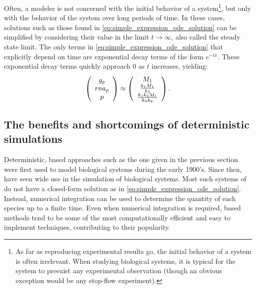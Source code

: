 Often, a modeler is not concerned with the initial behavior of a system\footnote{As far as reproducing experimental results go, the initial behavior of a system is often irrelevant. When studying biological systems, it is typical for the system to preexist any experimental observation (though an obvious exception would be any stop-flow experiment).}, but only with the behavior of the system over long periods of time. In these cases, solutions such as those found in \eqref{eq:simple_expression_ode_solution} can be simplified by considering their value in the limit $t \rightarrow \infty$, also called the steady state limit. The only terms in \eqref{eq:simple_expression_ode_solution} that explicitly depend on time are exponential decay terms of the form $e^{-t x}$. These exponential decay terms quickly approach $0$ as $t$ increases, yielding:
\begin{gather*}\label{eq:simple_expression_ode_solution_ss}
    \left( \begin{array}{c}
        \con{g_p} \\
        \con{rna_p} \\
        \con{p}
    \end{array} \right) \approx
%
    \left( \begin{array}{c}
        \markmat_1 \\
        \frac{\condetx{1} \markmat_1}{\condetx{3}} \\
        \frac{\condetx{1} \condetx{2} \markmat_1}{\condetx{3} \condetx{4}}
    \end{array} \right).
\end{gather*}

\subsection{The benefits and shortcomings of deterministic simulations}

Deterministic,  based approaches such as the one given in the previous section were first used to model biological systems during the early 1900's\supercite{Lotka:1909ho,Lotka:1925tu,Dublin:1925hj,Volterra:1926cl}. Since then,  have seen wide use in the simulation of biological systems. Most such systems of  do not have a closed-form solution as in \eqref{eq:simple_expression_ode_solution}. Instead, numerical integration\supercite{Turing:1952df} can be used to determine the quantity of each species up to a finite time. Even when numerical integration is required,  based methods tend to be some of the most computationally efficient and easy to implement techniques, contributing to their popularity.

